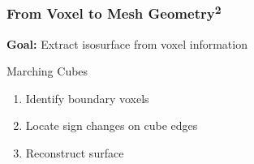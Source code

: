 


\begin{frame}
\frametitle{From Voxel to Mesh Geometry\textsuperscript{2}}
\vspace{-0.3cm}
\begin{center}
	\textbf{Goal:} Extract isosurface from voxel information	
\end{center}
\vspace{-0.5cm}	
\begin{minipage}[t]{0.4\linewidth}
	\begin{block}{Marching Cubes}
		\begin{enumerate}
			\item<2-> Identify boundary voxels
			\item<3-> Locate sign changes on cube edges
			\item<4-> Reconstruct surface
		\end{enumerate}
	\end{block}
\end{minipage}
\end{frame}
